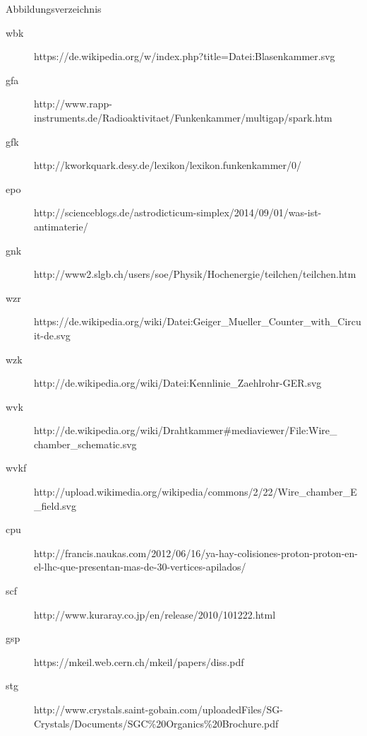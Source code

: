 \documentclass{beamer}
\begin{document}
\begin{frame}{Abbildungsverzeichnis}
\footnotesize
	\begin{adjustwidth}{-5em}{-2em}
	  	\begin{description}
		  	\item[wbk]
		  	https://de.wikipedia.org/w/index.php?title=Datei:Blasenkammer.svg
		  	\item[gfa]
		  	http://www.rapp-instruments.de/Radioaktivitaet/Funkenkammer/multigap/spark.htm
		  	\item[gfk]
		  	http://kworkquark.desy.de/lexikon/lexikon.funkenkammer/0/
		  	\item[epo]
		  	http://scienceblogs.de/astrodicticum-simplex/2014/09/01/was-ist-antimaterie/
		  	\item[gnk]
		  	http://www2.slgb.ch/users/soe/Physik/Hochenergie/teilchen/teilchen.htm
		  	\item[wzr]
		  	https://de.wikipedia.org/wiki/Datei:Geiger\_Mueller\_Counter\_with\_Circuit-de.svg
		  	\item[wzk]
			http://de.wikipedia.org/wiki/Datei:Kennlinie\_Zaehlrohr-GER.svg
			\item[wvk]
		  	http://de.wikipedia.org/wiki/Drahtkammer\#mediaviewer/File:Wire\_ chamber\_schematic.svg
		  	\item[wvkf]
		  	http://upload.wikimedia.org/wikipedia/commons/2/22/Wire\_chamber\_E\_field.svg
		  	\item[cpu]
		  	http://francis.naukas.com/2012/06/16/ya-hay-colisiones-proton-proton-en-el-lhc-que-presentan-mas-de-30-vertices-apilados/
		  	\item[scf]
		  	http://www.kuraray.co.jp/en/release/2010/101222.html
		  	\item[gsp]
		  	https://mkeil.web.cern.ch/mkeil/papers/diss.pdf
		  	\item[stg]
		  	http://www.crystals.saint-gobain.com/uploadedFiles/SG-Crystals/Documents/SGC\%20Organics\%20Brochure.pdf
		  	
		\end{description}
	\end{adjustwidth}  
\end{frame}
\end{document}
